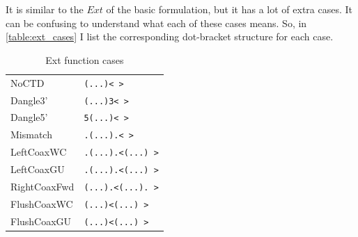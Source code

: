 \documentclass{cshonours}
\begin{document}
It is similar to the $Ext$ of the basic formulation, but it has a lot of extra cases. It can be confusing to understand what each of these cases means. So, in \autoref{table:ext_cases} I list the corresponding dot-bracket structure for each case.

\begin{table}[h]
\begin{adjustbox}{center}
\begin{tabular}{ll}
NoCTD & \texttt{(...)<   >} \\
Dangle3' & \texttt{(...)3<   >} \\
Dangle5' & \texttt{5(...)<   >} \\
Mismatch & \texttt{.(...).<   >} \\
LeftCoaxWC & \texttt{.(...).<(...) >} \\
LeftCoaxGU & \texttt{.(...).<(...) >} \\
RightCoaxFwd & \texttt{(...).<(...). >} \\
FlushCoaxWC & \texttt{(...)<(...) >} \\
FlushCoaxGU & \texttt{(...)<(...) >} \\
\end{tabular}
\end{adjustbox}
\caption{Ext function cases}
\label{table:ext_cases}
\end{table}
\end{document}
